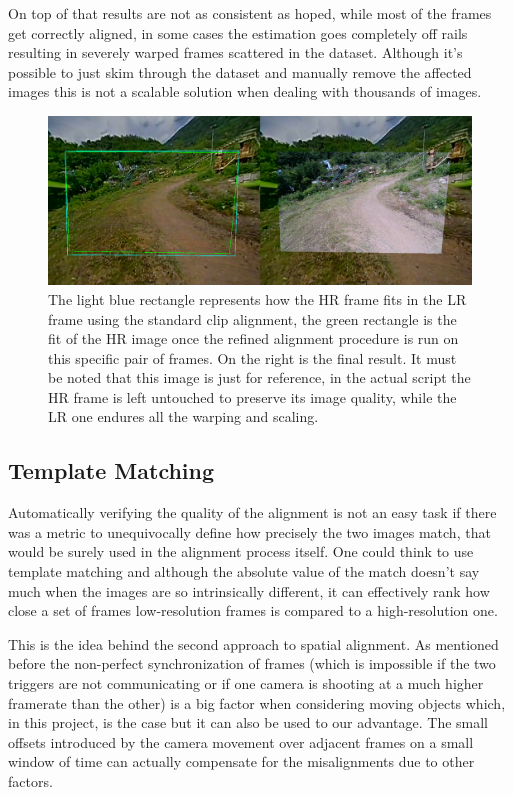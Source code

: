 On top of that results are not as consistent as hoped, while most of the frames get correctly aligned, in some cases the estimation goes completely off rails resulting in severely warped frames scattered in the dataset. Although it's possible to just skim through the dataset and manually remove the affected images this is not a scalable solution when dealing with thousands of images.

\begin{figure}[H]
  \centering
  \includegraphics[scale=1.2]{figures/deep_match_sbs.png}
  \caption{The light blue rectangle represents how the HR frame fits in the LR frame using the standard clip alignment, the green rectangle is the fit of the HR image once the refined alignment procedure is run on this specific pair of frames. On the right is the final result. It must be noted that this image is just for reference, in the actual script the HR frame is left untouched to preserve its image quality, while the LR one endures all the warping and scaling.}
  \label{img:deep_match}
\end{figure}

\subsection {Template Matching}
\label{subsec:template_match}

Automatically verifying the quality of the alignment is not an easy task if there was a metric to unequivocally define how precisely the two images match, that would be surely used in the alignment process itself. One could think to use template matching and although the absolute value of the match doesn't say much when the images are so intrinsically different, it can effectively rank how close a set of frames low-resolution frames is compared to a high-resolution one.

This is the idea behind the second approach to spatial alignment. As mentioned before the non-perfect synchronization of frames (which is impossible if the two triggers are not communicating or if one camera is shooting at a much higher framerate than the other) is a big factor when considering moving objects which, in this project, is the case but it can also be used to our advantage. The small offsets introduced by the camera movement over adjacent frames on a small window of time can actually compensate for the misalignments due to other factors.


